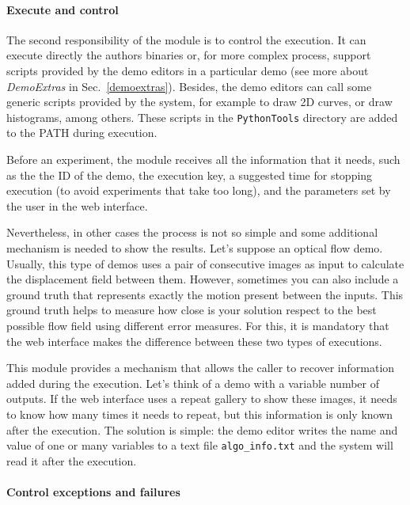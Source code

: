 \paragraph{Execute and control}
\noindent

The second responsibility of the module is to control the execution.  It can execute directly the authors binaries or, for more complex process, support scripts provided by the demo editors in a particular demo (see more about \textit{DemoExtras} in Sec.~\ref{demoextras}). Besides, the demo editors can call some generic scripts provided by the system, for example to draw 2D curves, or draw histograms, among others. These scripts in the {\tt PythonTools} directory are added to the PATH during execution.

Before an experiment, the module receives all the information that it needs, such as the the ID of the demo, the execution key, a suggested time for stopping execution (to avoid experiments that take too long), and the parameters set by the user in the web interface.

Nevertheless, in other cases the process is not so simple and some additional mechanism is needed to show the results.  Let's suppose an optical flow demo. Usually, this type of demos uses a pair of consecutive images as input to calculate the displacement field between them. However, sometimes you can also include a ground truth that represents exactly the motion present between the inputs. This ground truth helps to measure how close is your solution respect to the best possible flow field using different error measures. For this, it is mandatory that the web interface makes the difference between these two types of executions. 


This module provides a mechanism that allows the caller to recover information added during the execution. Let's think of a demo with a variable number of outputs. If the web interface uses a repeat gallery to show these images, it needs to know how many times it needs to repeat, but this information is only known after the execution. The solution is simple: the demo editor writes the name and value of one or many variables to a text file {\tt algo\_info.txt} and the system will read it after the execution.


\paragraph{Control exceptions and failures}
\noindent


